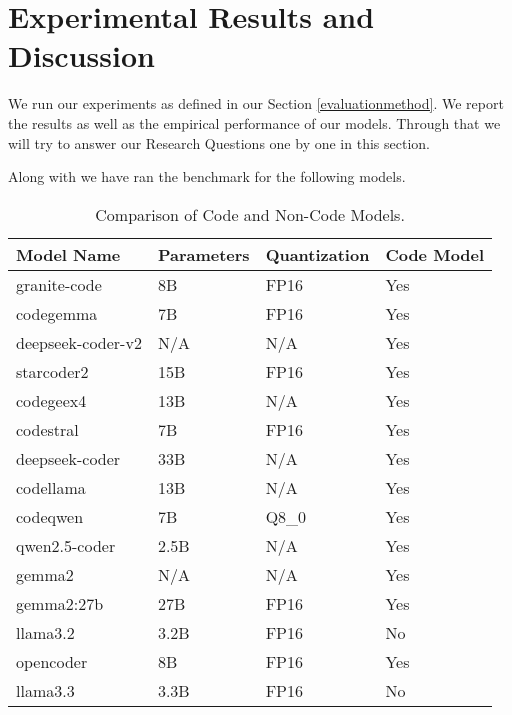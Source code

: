 \section{Experimental Results and Discussion}

We run our experiments as defined in our Section \ref{evaluationmethod}. We report the results as well as the empirical performance of our models. Through that we will try to answer our Research Questions one by one in this section.

Along with \sln{} we have ran the benchmark for the following models.

\begin{table}[ht]
    \scriptsize %
    \centering
    \setlength{\tabcolsep}{2pt} %
    \renewcommand{\arraystretch}{1.2} %
    \caption{Comparison of Code and Non-Code Models.}
    \label{tab:model-comparison}
    \begin{tabular}{@{}p{2.5cm}p{1.5cm}p{1.5cm}p{1cm}@{}}
        \toprule
        \textbf{Model Name} & \textbf{Parameters} & \textbf{Quantization} & \textbf{Code Model} \\ 
        \midrule
        granite-code     & 8B    & FP16 & Yes \\
        codegemma        & 7B    & FP16 & Yes \\
        deepseek-coder-v2            & N/A   & N/A  & Yes \\
        starcoder2                   & 15B   & FP16 & Yes \\
        codegeex4                    & 13B   & N/A  & Yes \\
        codestral                    & 7B    & FP16 & Yes \\
        deepseek-coder           & 33B   & N/A  & Yes \\
        codellama~\cite{roziere2023code}                & 13B   & N/A  & Yes \\
        codeqwen  & 7B    & Q8\_0 & Yes \\
        qwen2.5-coder                & 2.5B  & N/A  & Yes \\
        gemma2                       & N/A   & N/A  & Yes \\
        gemma2:27b                   & 27B   & FP16 & Yes \\
        llama3.2                     & 3.2B  & FP16 & No  \\
        opencoder   & 8B    & FP16 & Yes \\
        llama3.3                     & 3.3B  & FP16 & No  \\
        \bottomrule
    \end{tabular}

\end{table}


